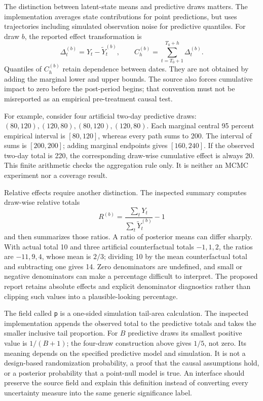 The distinction between latent-state means and predictive draws matters.
The implementation averages state contributions for point predictions, but
uses trajectories including simulated observation noise for predictive
quantiles. For draw \(b\), the reported effect transformation is
\[
 \Delta_t^{(b)}=Y_t-\widetilde Y_t^{(b)},\qquad
 C_h^{(b)}=\sum_{t=T_0+1}^{T_0+h}\Delta_t^{(b)}.
\]
Quantiles of \(C_h^{(b)}\) retain dependence between dates. They are not
obtained by adding the marginal lower and upper bounds. The source also
forces cumulative impact to zero before the post-period begins; that
convention must not be misreported as an empirical pre-treatment causal
test.\cite{exec13_ci_semantics,exec13_ci_brodersen2015}

For example, consider four artificial two-day predictive draws:
\((80,120),(120,80),(80,120),(120,80)\). Each marginal central 95 percent
empirical interval is \([80,120]\), whereas every path sums to 200. The
interval of sums is \([200,200]\); adding marginal endpoints gives
\([160,240]\). If the observed two-day total is 220, the corresponding
draw-wise cumulative effect is always 20. This finite arithmetic checks the
aggregation rule only. It is neither an MCMC experiment nor a coverage result.
\cite{exec13_ci_examples}

Relative effects require another distinction. The inspected summary computes
draw-wise relative totals
\[
 R^{(b)}=\frac{\sum_tY_t}{\sum_t\widetilde Y_t^{(b)}}-1
\]
and then summarizes those ratios. A ratio of posterior means can differ
sharply. With actual total 10 and three artificial counterfactual totals
\(-1,1,2\), the ratios are \(-11,9,4\), whose mean is \(2/3\); dividing
10 by the mean counterfactual total and subtracting one gives 14. Zero
denominators are undefined, and small or negative denominators can make a
percentage difficult to interpret. The proposed report retains absolute
effects and explicit denominator diagnostics rather than clipping such
values into a plausible-looking percentage.\cite{exec13_ci_semantics,exec13_ci_examples}

The field called \texttt{p} is a one-sided simulation tail-area calculation.
The inspected implementation appends the observed total to the predictive
totals and takes the smaller inclusive tail proportion. For \(B\) predictive
draws its smallest positive value is \(1/(B+1)\); the four-draw construction
above gives \(1/5\), not zero. Its meaning depends on the specified predictive
model and simulation. It is not a design-based randomization probability, a
proof that the causal assumptions hold, or a posterior probability that a
point-null model is true. An interface should preserve the source field and
explain this definition instead of converting every uncertainty measure into
the same generic significance label.\cite{exec13_ci_semantics,exec13_ci_examples}

